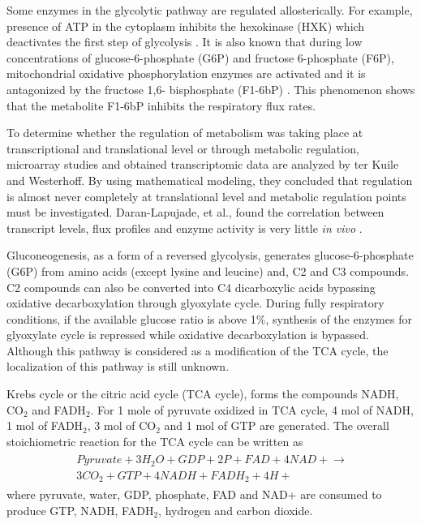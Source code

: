 Some enzymes in the glycolytic pathway are regulated allosterically. For example, presence of ATP in the cytoplasm inhibits the hexokinase (HXK) which deactivates the first step of glycolysis \cite{larsson2000importance}. It is also known that during low concentrations of glucose-6-phosphate (G6P) and fructose 6-phosphate (F6P), mitochondrial oxidative phosphorylation enzymes are activated and it is antagonized by the fructose 1,6- bisphosphate (F1-6bP) \cite{diaz2008mitochondrial}. This phenomenon shows that the metabolite F1-6bP inhibits the respiratory flux rates.

To determine whether the regulation of metabolism was taking place at transcriptional and translational level or through metabolic regulation, microarray studies and obtained transcriptomic data are analyzed by ter Kuile and Westerhoff\cite{ter2001transcriptome}. By using mathematical modeling, they concluded that regulation is almost never completely at translational level and metabolic regulation points must be investigated. Daran-Lapujade, et al., found the correlation between transcript levels, flux profiles and enzyme activity is very little \emph{in vivo} \cite{daran2004role}.

Gluconeogenesis, as a form of a reversed glycolysis, generates glucose-6-phosphate (G6P) from amino acids (except lysine and leucine) and, C2 and C3 compounds. C2 compounds can also be converted into C4 dicarboxylic acids bypassing oxidative decarboxylation through glyoxylate cycle. During fully respiratory conditions, if the available glucose ratio is above 1\%, synthesis of the enzymes for glyoxylate cycle is repressed while oxidative decarboxylation is bypassed. Although this pathway is considered as a modification of the TCA cycle, the localization of this pathway is still unknown.

Krebs cycle or the citric acid cycle (TCA cycle), forms the compounds NADH, CO$_2$ and FADH$_2$. For 1 mole of pyruvate oxidized in TCA cycle, 4 mol of NADH, 1 mol of FADH$_2$, 3 mol of CO$_2$ and 1 mol of GTP are generated. The overall stoichiometric reaction for the TCA cycle can be written as
\begin{align}
  \begin{split}
  \ Pyruvate + 3 H{_2}O + GDP + 2 P + FAD + 4 NAD+ \xrightarrow{} \\
  \ 3 CO{_2} + GTP + 4 NADH + FADH{_2}+ 4 H+
  \end{split}
\end{align}
where pyruvate, water, GDP, phosphate, FAD and NAD+ are consumed to produce GTP, NADH, FADH$_2$, hydrogen and carbon dioxide.

